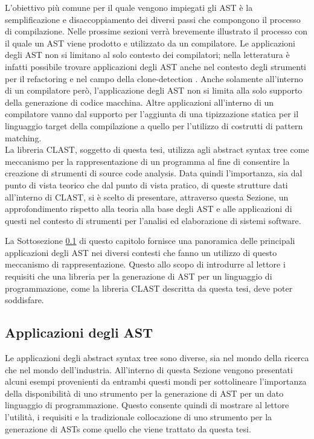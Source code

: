 L’obiettivo più comune per il quale vengono impiegati gli AST è la
semplificazione e disaccoppiamento dei diversi passi che compongono il processo
di compilazione. Nelle prossime sezioni verrà brevemente illustrato il processo
con il quale un AST viene prodotto e utilizzato da un compilatore. Le
applicazioni degli AST non si limitano al solo contesto dei compilatori; nella
letteratura è infatti possibile trovare applicazioni degli AST anche nel
contesto degli strumenti per il refactoring \cite{jscodeshift2016} e nel campo
della clone-detection \cite{DBLP:conf/saci/LazarB14}. Anche solamente
all’interno di un compilatore però, l’applicazione degli AST non si limita alla
solo supporto della generazione di codice macchina. Altre applicazioni
all’interno di un compilatore vanno dal supporto per l'aggiunta di una
tipizzazione statica per il linguaggio target della compilazione a quello per
l'utilizzo di costrutti di pattern matching.\\

La libreria CLAST, soggetto di questa tesi, utilizza agli abstract syntax tree
come meccanismo per la rappresentazione di un programma al fine di consentire la
creazione di strumenti di source code analysis. Data quindi l'importanza, sia
dal punto di vista teorico che dal punto di vista pratico, di queste strutture
dati all'interno di CLAST, si è scelto di presentare, attraverso questa Sezione,
un approfondimento rispetto alla teoria alla base degli AST e alle applicazioni
di questi nel contesto di strumenti per l'analisi ed elaborazione di sistemi
software.

La Sottosezione \ref{ast-applications} di questo capitolo fornisce una
panoramica delle principali applicazioni degli AST nei diversi contesti che
fanno un utilizzo di questo meccanismo di rappresentazione. Questo allo scopo di
introdurre al lettore i requisiti che una libreria per la generazione di AST per
un linguaggio di programmazione, come la libreria CLAST descritta da questa
tesi, deve poter soddisfare.

\subsection{Applicazioni degli AST}
\label{ast-applications}

Le applicazioni degli abstract syntax tree sono diverse, sia nel mondo della
ricerca che nel mondo dell’industria. All’interno di questa Sezione vengono
presentati alcuni esempi provenienti da entrambi questi mondi per sottolineare
l’importanza della disponibilità di uno strumento per la generazione di AST per
un dato linguaggio di programmazione. Questo consente quindi di mostrare al
lettore l’utilità, i requisiti e la tradizionale collocazione di uno strumento
per la generazione di ASTs come quello che viene trattato da questa tesi.


